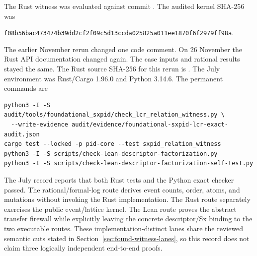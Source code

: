 \documentclass[11pt]{article}
\begin{document}
The Rust witness was evaluated against commit
.  The audited kernel SHA-256 was
\begin{center}
\texttt{f08b56bac473474b39dd2cf2f09c5d13ccda025825a011ee1870f6f2979ff98a}.
\end{center}
The earlier November rerun changed one code comment. On 26 November the Rust
API documentation changed again. The case inputs and rational results stayed
the same. The Rust source SHA-256 for this rerun is
.
The July environment was Rust/Cargo 1.96.0 and Python 3.14.6.  The permanent commands
are
\begin{verbatim}
python3 -I -S audit/tools/foundational_sxpid/check_lcr_relation_witness.py \
  --write-evidence audit/evidence/foundational-sxpid-lcr-exact-audit.json
cargo test --locked -p pid-core --test sxpid_relation_witness
python3 -I -S scripts/check-lean-descriptor-factorization.py
python3 -I -S scripts/check-lean-descriptor-factorization-self-test.py
\end{verbatim}
\smallskip
\noindent The July record reports that both Rust tests and the Python exact checker passed.  The
rational/formal-log route derives event counts, order, atoms, and mutations
without invoking the Rust implementation.  The Rust route separately
exercises the public event/lattice kernel.  The Lean route proves the abstract
transfer firewall while explicitly leaving the concrete descriptor/Sx binding
to the two executable routes.  These implementation-distinct lanes share the
reviewed semantic cuts stated in Section~\ref{sec:found-witness-lanes}, so this record does not claim
three logically independent end-to-end proofs.

\clearpage
{}
\end{document}
